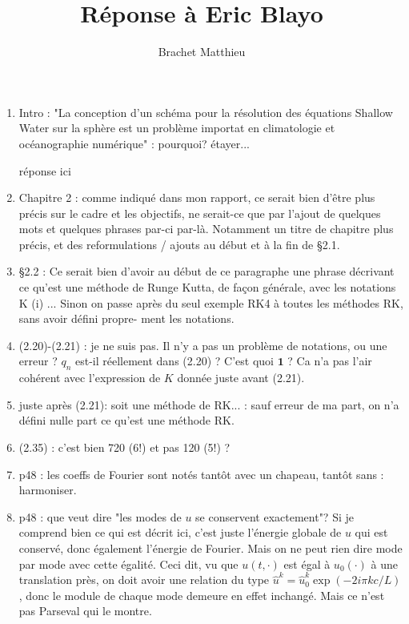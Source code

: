 \documentclass[10pt,a4paper]{article}
\author{Brachet Matthieu}
\title{Réponse à Eric Blayo}
\begin{document}
\maketitle

\begin{enumerate}
\item Intro : "La conception d'un schéma pour la résolution des équations Shallow Water sur la sphère est un problème importat en climatologie et océanographie numérique" : pourquoi? étayer...

{\color{blue} réponse ici} 

\item Chapitre 2 : comme indiqué dans mon rapport, ce serait bien d’être plus précis sur le
cadre et les objectifs, ne serait-ce que par l’ajout de quelques mots et quelques phrases
par-ci par-là. Notamment un titre de chapitre plus précis, et des reformulations /
ajouts au début et à la fin de §2.1.


\item §2.2 : Ce serait bien d’avoir au début de ce paragraphe une phrase décrivant ce qu’est
une méthode de Runge Kutta, de façon générale, avec les notations K (i) ... Sinon on
passe après du seul exemple RK4 à toutes les méthodes RK, sans avoir défini propre-
ment les notations.


\item (2.20)-(2.21) : je ne suis pas. Il n’y a pas un problème de notations, ou une erreur ? $q_n$
est-il réellement dans (2.20) ? C’est quoi $\mathbf{1}$ ? Ca n’a pas l’air cohérent avec l’expression
de $K$ donnée juste avant (2.21).


\item juste après (2.21): soit une méthode de RK... : sauf erreur de ma part, on n’a défini nulle part ce qu’est une méthode RK.


\item (2.35) : c’est bien 720 (6!) et pas 120 (5!) ?


\item p48 : les coeffs de Fourier sont notés tantôt avec un chapeau, tantôt sans : harmoniser.



\item p48 : que veut dire "les modes de $u$ se conservent exactement"? Si je comprend bien ce qui est décrit ici, c'est juste l'énergie globale de $u$ qui est conservé, donc également l'énergie de Fourier. Mais on ne peut rien dire mode par mode avec cette égalité. Ceci dit, vu que $u(t,\cdot)$ est égal à $u_0(\cdot)$ à une translation près, on doit avoir une relation du type $\hat{u}^k = \hat{u}^k_0 \exp (-2i \pi k c /L)$, donc le module de chaque mode demeure en effet inchangé. Mais ce n'est pas Parseval qui le montre.



\end{enumerate}
\end{document}
